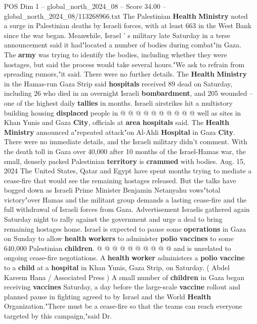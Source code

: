 \begin{textsample}{POS Dim 1 – global\_north\_2024\_08 – Score 34.00 – global\_north\_2024\_08/113268966.txt}
The Palestinian \textbf{Health} \textbf{Ministry} noted a surge in Palestinian deaths by Israeli forces, with at least 663 in the West Bank since the war began.
Meanwhile, Israel ' s military late Saturday in a terse announcement said it had"located a number of bodies during combat"in Gaza.
The \textbf{army} was trying to identify the bodies, including whether they were hostages, but said the process would take several hours."We ask to refrain from spreading rumors,"it said.
There were no further details.
The \textbf{Health} \textbf{Ministry} in the Hamas-run Gaza Strip said \textbf{hospitals} received 89 dead on Saturday, including 26 who died in an overnight Israeli \textbf{bombardment}, and 205 wounded -- one of the highest daily \textbf{tallies} in months.
Israeli airstrikes hit a multistory building housing \textbf{displaced} people in @ @ @ @ @ @ @ @ @ @ well as sites in Khan Yunis and Gaza \textbf{City}, officials at \textbf{area} \textbf{hospitals} said.
The \textbf{Health} \textbf{Ministry} announced a"repeated attack"on Al-Ahli \textbf{Hospital} in Gaza \textbf{City}.
There were no immediate details, and the Israeli military didn't comment.
With the death toll in Gaza over 40,000 after 10 months of the Israel-Hamas war, the small, densely packed Palestinian \textbf{territory} is \textbf{crammed} with bodies.
Aug. 15, 2024 The United States, Qatar and Egypt have spent months trying to mediate a cease-fire that would see the remaining hostages released.
But the talks have bogged down as Israeli Prime Minister Benjamin Netanyahu vows"total victory"over Hamas and the militant group demands a lasting cease-fire and the full withdrawal of Israeli forces from Gaza.
Advertisement Israelis gathered again Saturday night to rally against the government and urge a deal to bring remaining hostages home.
Israel is expected to pause some \textbf{operations} in Gaza on Sunday to allow \textbf{health} \textbf{workers} to administer \textbf{polio} \textbf{vaccines} to some 640,000 Palestinian \textbf{children}. @ @ @ @ @ @ @ @ @ @ and is unrelated to ongoing cease-fire negotiations.
A \textbf{health} \textbf{worker} administers a \textbf{polio} \textbf{vaccine} to a \textbf{child} at a \textbf{hospital} in Khan Yunis, Gaza Strip, on Saturday. ( Abdel Kareem Hana / Associated Press ) A small number of \textbf{children} in Gaza began receiving \textbf{vaccines} Saturday, a day before the large-scale \textbf{vaccine} rollout and planned pause in fighting agreed to by Israel and the World \textbf{Health} Organization."There must be a cease-fire so that the teams can reach everyone targeted by this campaign,"said Dr.

\end{textsample}
